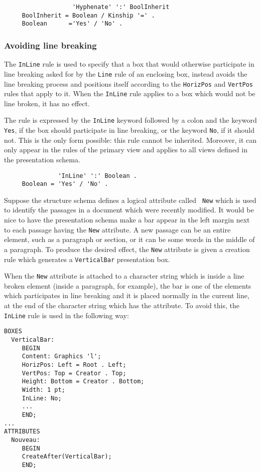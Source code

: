 \begin{verbatim}
                   'Hyphenate' ':' BoolInherit
     BoolInherit = Boolean / Kinship '=' .
     Boolean      ='Yes' / 'No' .
\end{verbatim}

\subsubsection{Avoiding line breaking}
\label{regleinline}

The {\tt InLine} rule is used to specify that a box that would
otherwise participate in line breaking asked for by the {\tt Line}
rule of an enclosing box, instead avoids the line breaking process and
positions itself  according to the {\tt HorizPos} and {\tt VertPos}
rules that apply to it.  When the {\tt InLine} rule applies to a box
which would not be line broken, it has no effect.

The rule is expressed by the {\tt InLine} keyword followed by a colon
and the keyword {\tt Yes}, if the box should participate in line
breaking, or the keyword {\tt No}, if it should not.  This is the only
form possible: this rule cannot be inherited.  Moreover, it can only
appear in the rules of the primary view and applies to all views
defined in the presentation schema.

\begin{verbatim}
               'InLine' ':' Boolean .
     Boolean = 'Yes' / 'No' .
\end{verbatim}

\begin{example}
Suppose the structure schema defines a logical attribute called {\tt
New} which is used to identify the passages in a document which were
recently modified.  It would be nice to have the presentation schema
make a bar appear in the left margin next to each passage having the
{\tt New} attribute.  A new passage can be an entire element, such as
a paragraph or section, or it can be some words in the middle of a
paragraph.  To produce the desired effect, the {\tt New} attribute is
given a creation rule which generates a {\tt VerticalBar} presentation
box.

When the {\tt New} attribute is attached to a character string which
is inside a line broken element (inside a paragraph, for example), the
bar is one of the elements which participates in line breaking and it
is placed normally in the current line, at the end of the character
string which has the attribute.  To avoid this, the {\tt InLine} rule
is used in the following way:
 
\begin{verbatim}
BOXES
  VerticalBar:
     BEGIN
     Content: Graphics 'l';
     HorizPos: Left = Root . Left;
     VertPos: Top = Creator . Top;
     Height: Bottom = Creator . Bottom;
     Width: 1 pt;
     InLine: No;
     ...
     END;
...
ATTRIBUTES
  Nouveau:
     BEGIN
     CreateAfter(VerticalBar);
     END;
\end{verbatim}
\end{example}

